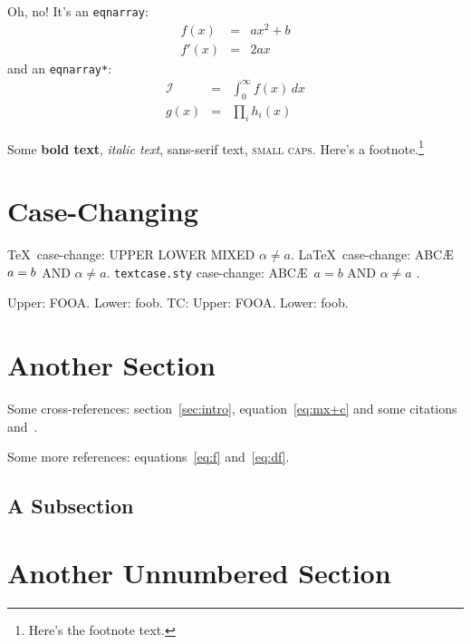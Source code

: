 \documentclass{article}
\begin{document}
Oh, no! It's an \texttt{eqnarray}:
\begin{eqnarray}
f(x) &=& ax^2 +b\label{eq:f}\\
f'(x) &=& 2ax\label{eq:df}
\end{eqnarray}
and an \texttt{eqnarray*}:
\begin{eqnarray*}
\mathcal{I} & = & \int_0^\infty f(x)\,dx\\
g(x) & = & \prod_i h_i(x)
\end{eqnarray*}

Some \textbf{bold text}, \textit{italic text}, 
\textsf{sans-serif text}, \textsc{small caps}.
Here's a footnote.\footnote{Here's the footnote text.}

\section{Case-Changing}
\label{sec:casechange}

\TeX\ case-change: \uppercase{upper \lowercase{LOWER} MiXeD $\alpha \neq a$.}
\LaTeX\ case-change: \MakeUppercase{abc\ae\ \protect\( a = b
\protect\) and $\alpha \neq a$}.
\texttt{textcase.sty} case-change: \MakeTextUppercase{abc\ae\ \( a = b \) and 
$\alpha \neq a$ }.

\newcommand{\foo}{fooa}
\newcommand{\FOO}{foob}
Upper: \uppercase{\foo}. Lower: \lowercase{\FOO}.
TC: Upper: \MakeTextUppercase{\foo}. Lower:
\MakeTextLowercase{\FOO}.


\section{Another Section}

Some cross-references: section~\ref{sec:intro},
equation~\ref{eq:mx+c} and some
citations~\cite{article-full,incollection-full}
and~\cite[some text]{inproceedings-full}.

Some more references: equations~\ref{eq:f} and~\ref{eq:df}.

\lipsum[2-3]

\subsection{A Subsection}

\lipsum[6-7]

\section*{Another Unnumbered Section}
\end{document}
